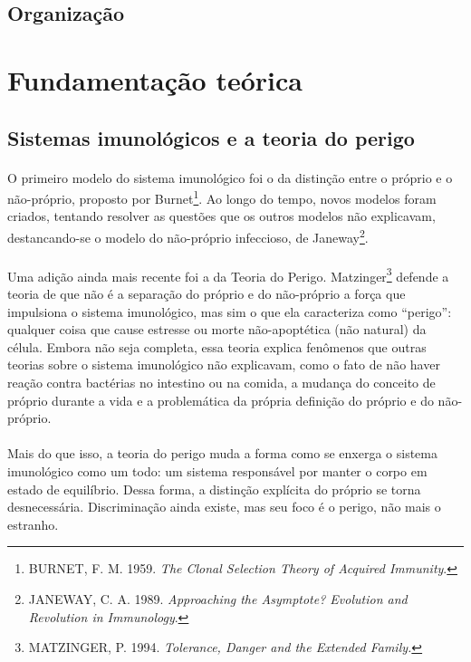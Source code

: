 \documentclass{article}
\begin{document}
\subsection{Organização}
\newpage

\section{Fundamentação teórica}

\subsection{Sistemas imunológicos e a teoria do perigo}

\paragraph{}O primeiro modelo do sistema imunológico foi o da distinção entre o próprio e o não-próprio, proposto por Burnet\footnote{BURNET, F. M. 1959. \emph{The Clonal Selection Theory of Acquired Immunity}.}. Ao longo do tempo, novos modelos foram criados, tentando resolver as questões que os outros modelos não explicavam, destancando-se o modelo do não-próprio infeccioso, de Janeway\footnote{JANEWAY, C. A. 1989. \emph{Approaching the Asymptote? Evolution and Revolution in Immunology}.}.

\paragraph{}Uma adição ainda mais recente foi a da Teoria do Perigo. Matzinger\footnote{MATZINGER, P. 1994. \emph{Tolerance, Danger and the Extended Family.}} defende a teoria de que não é a separação do próprio e do não-próprio a força que impulsiona o sistema imunológico, mas sim o que ela caracteriza como ``perigo'': qualquer coisa que cause estresse ou morte não-apoptética (não natural) da célula. Embora não seja completa, essa teoria explica fenômenos que outras teorias sobre o sistema imunológico não explicavam, como o fato de não haver reação contra bactérias no intestino ou na comida, a mudança do conceito de próprio durante a vida e a problemática da própria definição do próprio e do não-próprio.

\paragraph{}Mais do que isso, a teoria do perigo muda a forma como se enxerga o sistema imunológico como um todo: um sistema responsável por manter o corpo em estado de equilíbrio. Dessa forma, a distinção explícita do próprio se torna desnecessária. Discriminação ainda existe, mas seu foco é o perigo, não mais o estranho.
\end{document}
